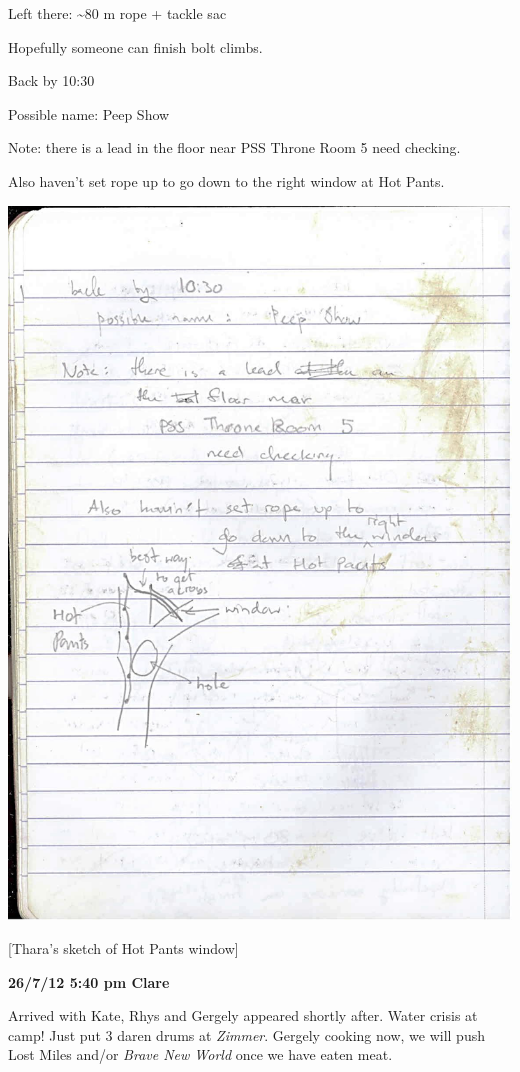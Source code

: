 Left there: \textasciitilde 80 m rope + tackle sac

Hopefully someone can finish bolt climbs.

Back by 10:30

Possible name: Peep Show

Note: there is a lead in the floor near PSS Throne Room 5 need checking.

Also haven't set rope up to go down to the right window at Hot Pants.

\includegraphics{UgLog1012/77.jpeg}

{[}Thara's sketch of Hot Pants window{]}

\textbf{26/7/12 5:40 pm Clare}

Arrived with Kate, Rhys and Gergely appeared shortly after. Water crisis
at camp! Just put 3 daren drums at \emph{Zimmer}. Gergely cooking now,
we will push Lost Miles and/or \emph{Brave New World} once we have eaten
meat.

